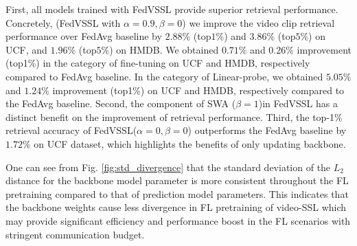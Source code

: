 First, all models trained with FedVSSL provide superior retrieval performance.
Concretely, (FedVSSL with $\alpha=0.9, \beta=0$) we improve the video clip retrieval performance over FedAvg baseline by $2.88\%$ (top$1\%$) and $3.86\%$ (top$5\%$) on UCF, and $1.96\%$ (top$5\%$) on HMDB. We obtained $0.71\%$ and $0.26\%$ improvement (top1\%) in the category of fine-tuning  on UCF and HMDB, respectively compared to FedAvg baseline. In the category of Linear-probe, we obtained $5.05\%$ and $1.24\%$ improvement (top1\%) on UCF and HMDB, respectively compared to the FedAvg baseline.  
Second, the component of SWA ($\beta=1$)in FedVSSL has a distinct benefit on the improvement of retrieval performance. 
Third, the top-1\% retrieval accuracy of FedVSSL($\alpha=0,\beta=0$) outperforms the FedAvg baseline by $1.72\%$ on UCF dataset, which highlights the benefits of only updating backbone. 


One can see from Fig. \ref{fig:std_divergence} that the standard deviation of the $L_{2}$ distance for the backbone model parameter is more consistent throughout the FL pretraining compared to that of prediction model parameters. This indicates that the backbone weights cause less divergence in FL pretraining of video-SSL which may provide significant efficiency and performance boost in the FL scenarios with stringent communication budget. 

    



